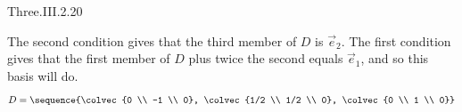 \begin{ans}{Three.III.2.20}
\begin{exparts}
            The second condition gives that the third member of $D$
            is $\vec{e}_2$.
            The first condition gives that the first member of $D$ plus twice
            the second equals $\vec{e}_1$, and so this basis will do.
            \begin{equation*}
              D=\sequence{\colvec{0 \\ -1 \\ 0},
                          \colvec{1/2 \\ 1/2 \\ 0},
                          \colvec{0 \\ 1 \\ 0}}
            \end{equation*}
       \end{exparts}
     
\end{ans}
